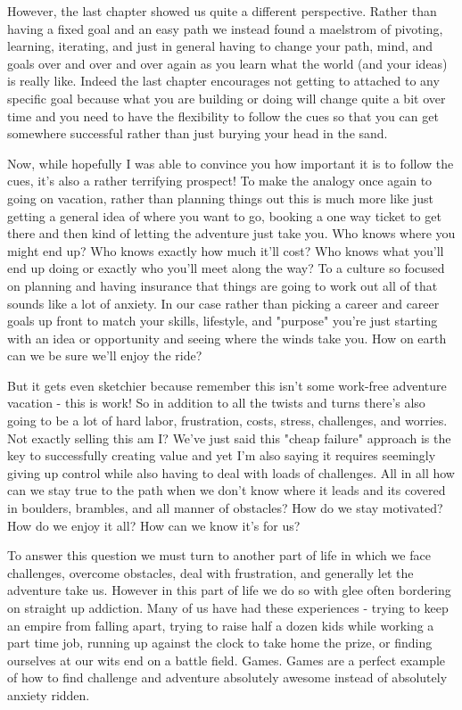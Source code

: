 \documentclass[11pt]{book}
\begin{document}
However, the last chapter showed us quite a different perspective. Rather than having a fixed goal and an easy path we instead found a maelstrom of pivoting, learning, iterating, and just in general having to change your path, mind, and goals over and over and over again as you learn what the world (and your ideas) is really like. Indeed the last chapter encourages not getting to attached to any specific goal because what you are building or doing will change quite a bit over time and you need to have the flexibility to follow the cues so that you can get somewhere successful rather than just burying your head in the sand. 
\newline

Now, while hopefully I was able to convince you how important it is to follow the cues, it's also a rather terrifying prospect! To make the analogy once again to going on vacation, rather than planning things out this is much more like just getting a general idea of where you want to go, booking a one way ticket to get there and then kind of letting the adventure just take you. Who knows where you might end up? Who knows exactly how much it'll cost? Who knows what you'll end up doing or exactly who you'll meet along the way? To a culture so focused on planning and having insurance that things are going to work out all of that sounds like a lot of anxiety. In our case rather than picking a career and career goals up front to match your skills, lifestyle, and "purpose" you're just starting with an idea or opportunity and seeing where the winds take you. How on earth can we be sure we'll enjoy the ride?
\newline

But it gets even sketchier because remember this isn't some work-free adventure vacation - this is work! So in addition to all the twists and turns there's also going to be a lot of hard labor, frustration, costs, stress, challenges, and worries. Not exactly selling this am I? We've just said this "cheap failure" approach is the key to successfully creating value and yet I'm also saying it requires seemingly giving up control while also having to deal with loads of challenges. All in all how can we stay true to the path when we don't know where it leads and its covered in boulders, brambles, and all manner of obstacles? How do we stay motivated? How do we enjoy it all? How can we know it's for us?
\newline

To answer this question we must turn to another part of life in which we face challenges, overcome obstacles, deal with frustration, and generally let the adventure take us. However in this part of life we do so with glee often bordering on straight up addiction. Many of us have had these experiences - trying to keep an empire from falling apart, trying to raise half a dozen kids while working a part time job, running up against the clock to take home the prize, or finding ourselves at our wits end on a battle field. Games. Games are a perfect example of how to find challenge and adventure absolutely awesome instead of absolutely anxiety ridden. 
\newline
\end{document}
